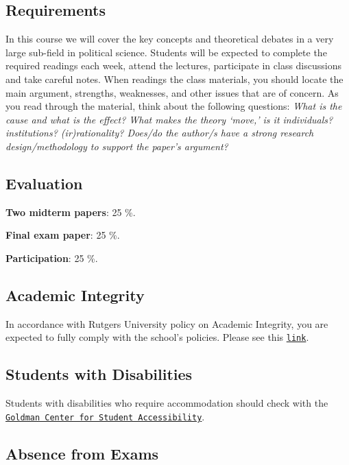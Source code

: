 \documentclass[letterpaper]{article}
\renewenvironment{itemize}{
  \begin{list}{}{
    \setlength{\leftmargin}{1.5em}
  }
}{
  \end{list}
}
\begin{document}
\subsection*{Requirements}

In this course we will cover the key concepts and theoretical debates in a very large sub-field in political science. Students will be expected to complete the required readings each week, attend the lectures, participate in class discussions and take careful notes. When readings the class materials, you should locate the main argument, strengths, weaknesses, and other issues that are of concern. As you read through the material, think about the following questions: \emph{What is the cause and what is the effect? What makes the theory `move,' is it individuals? institutions? (ir)rationality? Does/do the author/s have a strong research design/methodology to support the paper's argument?}


\subsection*{Evaluation}


\begin{itemize}
	\item[$\bullet$] {\bf Two midterm papers}: 25 \%.
	\item[$\bullet$] {\bf Final exam paper}: 25 \%.
	\item[$\bullet$] {\bf Participation}: 25 \%.
\end{itemize}


\subsection*{Academic Integrity}
In accordance with Rutgers University policy on Academic Integrity, you are expected to fully comply with the school's policies.  Please see this \href{http://academicintegrity.rutgers.edu}{\texttt{link}}.


\subsection*{Students with Disabilities}
Students with disabilities who require accommodation should check with the \href{http://accessibility.tulane.edu}{\texttt{Goldman Center for Student Accessibility}}.


\subsection*{Absence from Exams}
\end{document}
